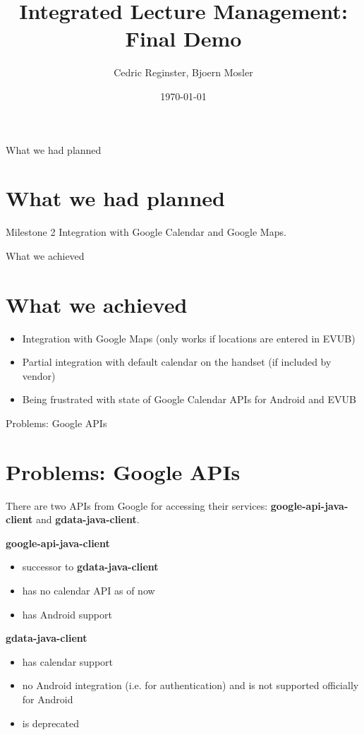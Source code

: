 \documentclass{beamer}
\title[Integrated Lecture Management]{Integrated Lecture Management: Final Demo}
\date{\today}
\institute{IAM}
\author{Cedric Reginster, Bjoern Mosler}
\begin{document}
\begin{frame}
	\titlepage
\end{frame}


\begin{frame}{What we had planned}
	\section{What we had planned}
\bigskip 

	\begin{block}{Milestone 2}
	Integration with Google Calendar and Google Maps.
	\end{block}
\end{frame}

\begin{frame}{What we achieved}
	\section{What we achieved}
	\begin{itemize}
		\item Integration with Google Maps (only works if locations are entered in EVUB)
		\item Partial integration with default calendar on the handset (if included by vendor)
		\item Being frustrated with state of Google Calendar APIs for Android and EVUB
	\end{itemize}
\end{frame}

\begin{frame}{Problems: Google APIs}
	\section{Problems: Google APIs}
	There are two APIs from Google for accessing their services: \textbf{google-api-java-client} and 			\textbf{gdata-java-client}.
		\\
	\bigskip

	\textbf{google-api-java-client}
	\begin{itemize}
		\item successor to \textbf{gdata-java-client}
		\item has no calendar API as of now
		\item has Android support
	\end{itemize}
		\bigskip
	\textbf{gdata-java-client}
	\begin{itemize}
		\item has calendar support
		\item no Android integration (i.e. for authentication) and is not supported officially for Android
		\item is deprecated
	\end{itemize}
	
\end{frame}
\end{document}
